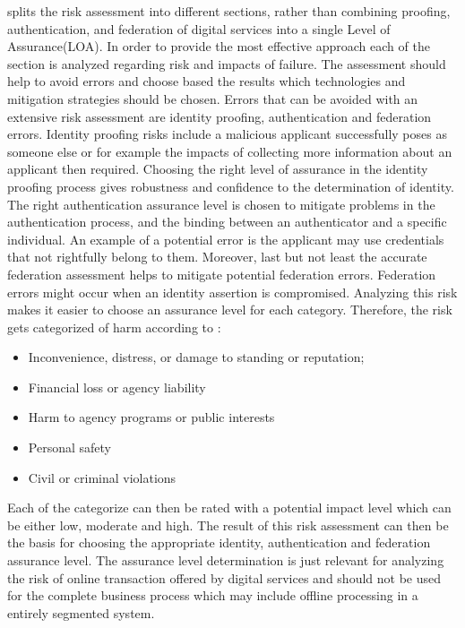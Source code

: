 \cite{NIST:2017:DIG} splits the risk assessment into different sections, rather than combining proofing, authentication, and federation of digital services into a single Level of Assurance(LOA). In order to provide the most effective approach each of the section is analyzed regarding risk and impacts of failure. The assessment should help to avoid errors and choose based the results which technologies and mitigation strategies should be chosen. Errors that can be avoided with an extensive risk assessment are identity proofing, authentication and federation errors. Identity proofing risks include a malicious applicant successfully poses as someone else or for example the impacts of collecting more information about an applicant then required. Choosing the right level of assurance in the identity proofing process gives robustness and confidence to the determination of identity. The right authentication assurance level is chosen to mitigate problems in the authentication process, and the binding between an authenticator and a specific individual. An example of a potential error is the applicant may use credentials that not rightfully belong to them. Moreover, last but not least the accurate federation assessment helps to mitigate potential federation errors. Federation errors might occur when an identity assertion is compromised. Analyzing this risk makes it easier to choose an assurance level for each category. Therefore, the risk gets categorized of harm according to \cite{NIST:2017:DIG}: 

\begin{itemize}
	\item Inconvenience, distress, or damage to standing or reputation;
	\item Financial loss or agency liability
	\item Harm to agency programs or public interests
	\item Personal safety
	\item Civil or criminal violations
\end{itemize}

Each of the categorize can then be rated with a potential impact level which can be either low, moderate and high. The result of this risk assessment can then be the basis for choosing the appropriate identity, authentication and federation assurance level. The assurance level determination is just relevant for analyzing the risk of online transaction offered by digital services and should not be used for the complete business process which may include offline processing in a entirely segmented system. 

